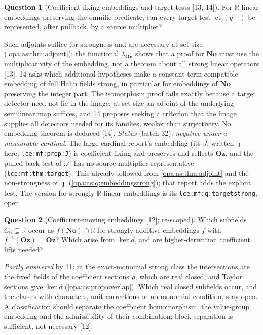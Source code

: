 \documentclass[11pt,oneside]{article}
\numberwithin{equation}{section}
\theoremstyle{definition}
\newtheorem{question}[question]{Question}
\theoremstyle{remark}
\newcommand{\No}{\mathbf{No}}
\newcommand{\Oz}{\mathbf{Oz}}
\newcommand{\R}{\mathbb R}
\newcommand{\ct}{\operatorname{ct}}
\newcommand{\src}[1]{\textup{\textsf{\small[#1]}}}
\newcommand{\lbl}[1]{\nolinkurl{#1}}
\newcommand{\On}{\mathbf{On}}
\begin{document}
\begin{question}[Coefficient-fixing embeddings and target tests \src{13, 14}]\label{opa:as:q:targettests}
For $\R$-linear embeddings preserving the omnific predicate, can every target test $\ct(y\,\cdot\,)$ be represented,
after pullback, by a source multiplier?
\end{question}
Such adjoints suffice for strongness and are necessary at set size (\cref{opa:as:thm:adjoint}); the functional
$\lambda_{\On}$ shows that a proof for $\No$ must use the multiplicativity of the embedding, not a theorem about all
strong linear operators \src{13}. 14 asks which additional hypotheses make a constant-term-compatible embedding of full
Hahn fields strong, in particular for embeddings of $\No$ preserving the integer part. The isomorphism proof fails
exactly because a target detector need not lie in the image; at set size an adjoint of the underlying semilinear map
suffices, and 14 proposes seeking a criterion that the image supplies all detectors needed for its families, weaker
than surjectivity. No embedding theorem is deduced \src{14}. \emph{Status} (batch 32): \emph{negative under a
measurable cardinal}. The large-cardinal report's embedding (its $J$, written $\hat\jmath$ here;
\lbl{lce:mf:prop:J}) is coefficient-fixing and preserves and reflects $\Oz$, and the pulled-back test of
$\omega^\kappa$ has no source multiplier representative (\lbl{lce:mf:thm:target}). This already followed from
\cref{opa:as:thm:adjoint} and the non-strongness of $\hat\jmath$ (\cref{opa:as:q:embeddingstrong}); that report
adds the explicit test. The version for strongly $\R$-linear embeddings is its \lbl{lce:mf:q:targetstrong}, open.

\begin{question}[Coefficient-moving embeddings \src{12}; re-scoped]\label{opa:as:q:coefficientmoving}
Which subfields $C_0\subseteq\R$ occur as $f(\No)\cap\R$ for strongly additive embeddings $f$ with
$f^{-1}(\Oz)=\Oz$? Which arise from $\ker d$, and are higher-derivation coefficient lifts needed?
\end{question}
\emph{Partly answered} by 11: in the exact-monomial strong class the intersections are the fixed fields of the
coefficient sections $\rho$, which are real closed, and Taylor sections give $\ker d$
(\cref{opa:as:prop:overlap}). Which real closed subfields occur, and the classes with characters, unit corrections
or no monomial condition, stay open. A classification should separate the coefficient homomorphism, the value-group
embedding and the admissibility of their combination; block separation is sufficient, not necessary \src{12}.
\end{document}
